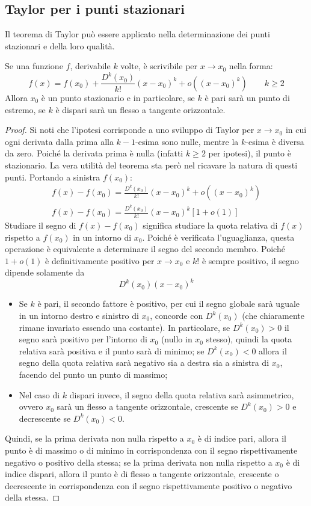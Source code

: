 \subsection{Taylor per i punti stazionari}
Il teorema di Taylor può essere applicato nella determinazione dei punti stazionari e della loro qualità.
\begin{teor}
	Se una funzione $f$, derivabile $k$ volte, è scrivibile per $x\to x_0$ nella forma:
	\[
		f(x)=f(x_0)+\frac{D^k(x_0)}{k!}(x-x_0)^k+o((x-x_0)^k)\qquad k\geq2
	\]
	Allora $x_0$ è un punto stazionario e in particolare, se $k$ è pari sarà un punto di estremo, se $k$ è dispari sarà un flesso a tangente orizzontale.
\end{teor}
\begin{proof}
	Si noti che l'ipotesi corrisponde a uno sviluppo di Taylor per $x\to x_0$ in cui ogni derivata dalla prima alla $k-1$-esima sono nulle, mentre la $k$-esima è diversa da zero. Poiché la derivata prima è nulla (infatti $k\geq2$ per ipotesi), il punto è stazionario. La vera utilità del teorema sta però nel ricavare la natura di questi punti. Portando a sinistra $f(x_0)$:
	\begin{gather*}
		f(x)-f(x_0)=\frac{D^k(x_0)}{k!}(x-x_0)^k+o((x-x_0)^k)\\
		f(x)-f(x_0)=\frac{D^k(x_0)}{k!}(x-x_0)^k[1+o(1)]
	\end{gather*}
	Studiare il segno di $f(x)-f(x_0)$ significa studiare la quota relativa di $f(x)$ rispetto a $f(x_0)$ in un intorno di $x_0$. Poiché è verificata l'uguaglianza, questa operazione è equivalente a determinare il segno del secondo membro. Poiché $1+o(1)$ è definitivamente positivo per $x\to x_0$ e $k!$ è sempre positivo, il segno dipende solamente da
	\[
		D^k(x_0)(x-x_0)^k
	\]
	\begin{itemize}
		\item Se $k$ è pari, il secondo fattore è positivo, per cui il segno globale sarà uguale in un intorno destro e sinistro di $x_0$, concorde con $D^k(x_0)$ (che chiaramente rimane invariato essendo una costante). In particolare, se $D^k(x_0)>0$ il segno sarà positivo per l'intorno di $x_0$ (nullo in $x_0$ stesso), quindi la quota relativa sarà positiva e il punto sarà di minimo; se $D^k(x_0)<0$ allora il segno della quota relativa sarà negativo sia a destra sia a sinistra di $x_0$, facendo del punto un punto di massimo;
		\item Nel caso di $k$ dispari invece, il segno della quota relativa sarà asimmetrico, ovvero $x_0$ sarà un flesso a tangente orizzontale, crescente se $D^k(x_0)>0$ e decrescente se $D^k(x_0)<0$.
	\end{itemize}
	Quindi, se la prima derivata non nulla rispetto a $x_0$ è di indice pari, allora il punto è di massimo o di minimo in corrispondenza con il segno rispettivamente negativo o positivo della stessa; se la prima derivata non nulla rispetto a $x_0$ è di indice dispari, allora il punto è di flesso a tangente orizzontale, crescente o decrescente in corrispondenza con il segno rispettivamente positivo o negativo della stessa.
\end{proof}


